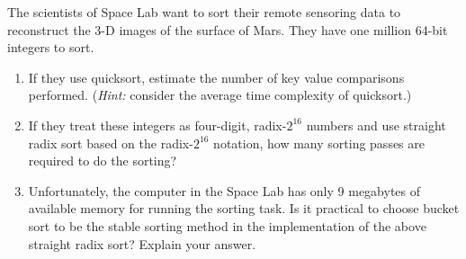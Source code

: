 The scientists of Space Lab want to sort their remote sensoring data to
reconstruct the 3-D images of the surface of Mars. They have one
million 64-bit integers to sort.

\begin{enumerate}

\item  If they use quicksort, estimate the number of key value
comparisons performed. ({\em Hint:} consider the average time
complexity of quicksort.)

\item  If they treat these integers as four-digit, radix-$2^{16}$
numbers and use straight radix sort based on the radix-$2^{16}$
notation, how many sorting passes are required to do the sorting?

\item  Unfortunately, the computer in the Space Lab has only 9 megabytes
of available memory for running the sorting task.  Is it practical to
choose bucket sort to be the stable sorting method in the
implementation of the above straight radix sort? Explain your answer.

\end{enumerate}
